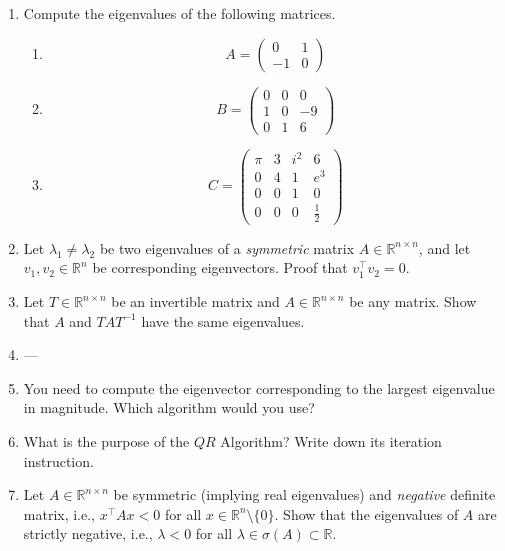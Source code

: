\vspace*{-0.5cm}
\begin{enumerate}
	\item Compute the eigenvalues of the following matrices. %
	\begin{enumerate}
		\item $$
		A = \begin{pmatrix}
		0&1\\
		-1&0
		\end{pmatrix}
		$$
		\item
		$$
		B = \begin{pmatrix}
		0&0&0\\
		1&0&-9\\
		0&1&6
		\end{pmatrix}
		$$
		\item $$
		C = \begin{pmatrix}
		\pi& 3& i^2& 6\\
		0 & 4& 1  & e^3\\
		0 & 0& 1  & 0\\
		0 & 0& 0  & \frac{1}{2}
		\end{pmatrix}
		$$
	\end{enumerate}
	\item Let $\lambda_1 \neq \lambda_2$ be two eigenvalues of a \textit{symmetric} matrix $A \in \mathbb{R}^{n \times n}$, and let 
	$v_1, v_2 \in \mathbb{R}^n$ be corresponding eigenvectors. Proof that $v_1^\top v_2 = 0$. 
	\item Let $T \in \mathbb{R}^{n \times n}$ be an invertible matrix and $A \in \mathbb{R}^{n \times n}$ be any matrix. Show that $A$ and $T A T^{-1}$ have the same eigenvalues.
	
	\item ---
	\item You need to compute the eigenvector corresponding to the largest eigenvalue in magnitude. Which algorithm would you use?
	\item What is the purpose of the $QR$ Algorithm? Write down its iteration instruction.
	\item Let $A \in \mathbb{R}^{n \times n}$ be symmetric (implying real eigenvalues) and \textit{negative} definite matrix, i.e., $x^\top A x < 0$ for all $x \in \mathbb{R}^{n}\setminus \{0\}$. Show that the eigenvalues of $A$ are strictly negative, i.e., $\lambda < 0 $ for all $\lambda \in \sigma(A) \subset \mathbb{R}$.
	

\end{enumerate}
